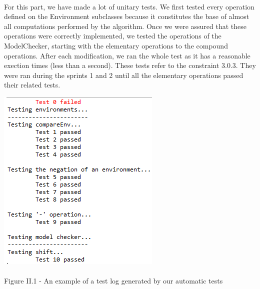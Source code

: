 \documentclass{report}
\begin{document}
\paragraph{}
\hspace{4mm}For this part, we have made a lot of unitary tests. We first tested every operation defined on the Environment subclasses
because it constitutes the base of almost all computations performed by the algorithm. Once we were assured that these operations were correctly implemented,
we tested the operations of the ModelChecker, starting with the elementary operations to the compound operations. 
After each modification, we ran the whole test as it has a reasonable exection times (less than a second). These tests refer to the constraint 3.0.3. They were ran
during the sprints 1 and 2 until all the elementary operations passed their related tests.

\begin{center}
\includegraphics[scale=0.85]{data/test-log}
~\\~\\Figure II.1 - An example of a test log generated by our automatic tests
\end{center}
\end{document}
